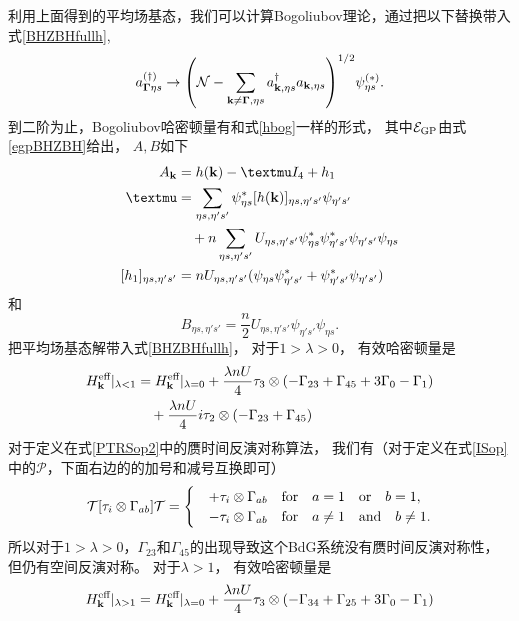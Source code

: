 利用上面得到的平均场基态，我们可以计算Bogoliubov理论，通过把以下替换带入式\eqref{BHZBHfullh},
\begin{equation}
	a^{(\dagger)}_{\boldsymbol{\Gamma}\eta s} \rightarrow  \pqty{\mathcal N-\sum_{\vb k\neq\boldsymbol{\Gamma},\eta s}a^\dagger_{\vb k,\eta s}a_{\vb k,\eta s}}^{1/2}\psi^{(*)}_{\eta s}.\nonumber
\end{equation}
到二阶为止，Bogoliubov哈密顿量有和式\eqref{hbog}一样的形式，
其中$\mathcal E_{\textnormal{GP}}$由式\eqref{egpBHZBH}给出，
$A,B$如下
\begin{align}
	A_{\vb k} &= h(\vb k) - \mu I_4 + h_1 \\
	\mu &= \sum_{\eta s,\eta' s'}\psi^*_{\eta s}[h(\vb k)]_{\eta s,\eta' s'}\psi_{\eta' s'}\\
	&\quad +n\sum_{\eta s,\eta' s'} U_{\eta s,\eta' s'} \psi^*_{\eta s} \psi^*_{\eta' s'}\psi_{\eta' s'}\psi_{\eta s} \\
	[h_1]_{\eta s,\eta' s'} &= n  U_{\eta s,\eta' s'}(\psi_{\eta s}\psi^*_{\eta's'}+\psi_{\eta' s'}^*\psi_{\eta' s'})
\end{align}
和
\begin{equation}
	B_{\eta s,\eta' s'}=\frac{n}{2} U_{\eta s,\eta' s'} \psi_{\eta' s'}\psi_{\eta s}.
\end{equation}
把平均场基态解带入式\eqref{BHZBHfullh}，
对于$1>\lambda>0$，
有效哈密顿量是
\begin{equation}
	\begin{split}
		H^{\text{eff}}_{\vb k} \vert_{\lambda<1} &= H^{\text{eff}}_{\vb k}\vert_{\lambda=0} + \frac{\lambda nU}{4}   \tau_3\otimes (-\Gamma_{23}+\Gamma_{45}+3\Gamma_0-\Gamma_1)\\
	&\quad +\frac{\lambda nU}{4} i   \tau_2 \otimes (-\Gamma_{23}+\Gamma_{45})
	\end{split}
\end{equation}
对于定义在式\eqref{PTRSop2}中的赝时间反演对称算法，
我们有（对于定义在式\eqref{ISop}中的$\mathcal P$，下面右边的的加号和减号互换即可）
\begin{equation}
	\mathcal T [\tau_i \otimes \Gamma_{ab}] \mathcal T = \begin{cases}
		&+\tau_i \otimes\Gamma_{ab} \qfor a=1 \qor b=1,\\
		&-\tau_i \otimes\Gamma_{ab} \qfor a \neq 1 \qand b \neq 1.
	\end{cases}\nonumber
\end{equation}
所以对于$1>\lambda>0$，$\Gamma_{23}$和$\Gamma_{45}$的出现导致这个BdG系统没有赝时间反演对称性，
但仍有空间反演对称。
对于$\lambda>1$，
有效哈密顿量是
\begin{equation}
	H^{\text{eff}}_{\vb k}\vert_{\lambda>1} = H^{\text{eff}}_{\vb k}\vert_{\lambda=0}+\frac{\lambda nU}{4}\tau_3\otimes (-\Gamma_{34}+\Gamma_{25}+3\Gamma_0-\Gamma_1)
\end{equation}

